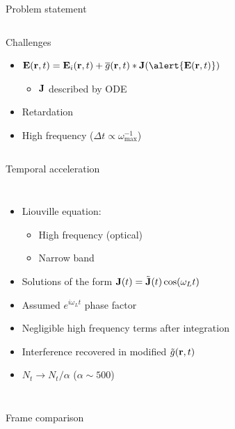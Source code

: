 \documentclass[aspectratio=169, usenames, dvipsnames]{beamer}
\begin{document}
\begin{frame}{Problem statement}
\begin{columns}[t]
      \begin{block}{Challenges}
        \begin{itemize}
          \item $\vb{E}(\vb{r}, t) = \vb{E}_i(\vb{r}, t) + \overline{g}(\vb{r}, t) * \vb{J}(\alert{\vb{E}(\vb{r}, t)})$
            \begin{itemize}
              \item $\vb{J}$ described by ODE
            \end{itemize}
          \item Retardation
          \item High frequency ($\Delta t \propto \omega_\text{max}^{-1}$)
        \end{itemize}
      \end{block}

  \end{columns}
\end{frame}

\begin{frame}{Temporal acceleration}
  \begin{columns}
      \begin{itemize}
        \item Liouville equation:
          \begin{itemize}
            \item High frequency (optical)
            \item Narrow band
          \end{itemize}
        \item Solutions of the form $\vb{J}(t) = \tilde{\vb{J}}(t) \cos(\omega_L t)$
        \item Assumed $e^{i \omega_L t}$ phase factor
        \item Negligible high frequency terms after integration
        \item Interference recovered in modified $\tilde{g}(\vb{r}, t)$
        \item $N_t \to N_t/\alpha$ ($\alpha \sim 500$)
      \end{itemize}

      \vspace{0.5cm}
      
  \end{columns}
\end{frame}

\begin{frame}{Frame comparison}
  \vspace{0.5cm}
  \begin{center}
    
  \end{center}
\end{frame}
\end{document}
